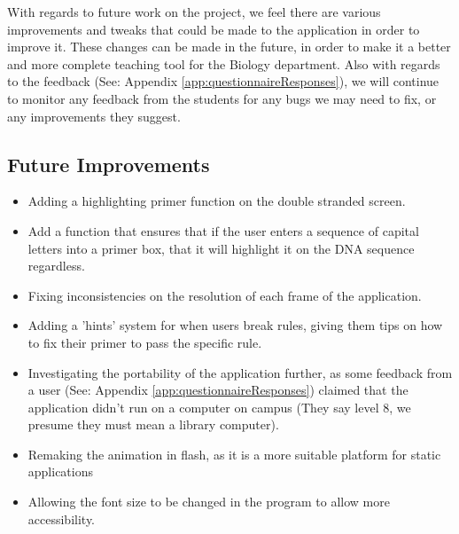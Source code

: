 
With regards to future work on the project, we feel there are various improvements and tweaks that could be made to the application in order to improve it. These changes can be made in the future, in order to make it a better and more complete teaching tool for the Biology department. Also with regards to the feedback (See: Appendix \ref{app:questionnaireResponses}), we will continue to monitor any feedback from the students for any bugs we may need to fix, or any improvements they suggest.

\subsection{Future Improvements}

\begin{itemize}

\item Adding a highlighting primer function on the double stranded screen.

\item Add a function that ensures that if the user enters a sequence of capital letters into a primer box, that it will highlight it on the DNA sequence regardless.

\item Fixing inconsistencies on the resolution of each frame of the application.

\item Adding a 'hints' system for when users break rules, giving them tips on how to fix their primer to pass the specific rule.

\item Investigating the portability of the application further, as some feedback from a user (See: Appendix \ref{app:questionnaireResponses}) claimed that the application didn't run on a computer on campus (They say level 8, we presume they must mean a library computer).

\item Remaking the animation in flash, as it is a more suitable platform for static applications

\item Allowing the font size to be changed in the program to allow more accessibility.

 

\end{itemize}











